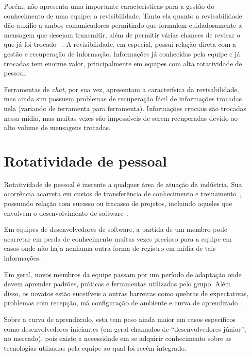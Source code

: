 Porém, não apresenta uma importante características para a gestão do conhecimento de uma equipe: a revisibilidade. Tanto ela quanto a revisabilidade dão auxílio a ambos comunicadores permitindo que formulem cuidadosamente a mensagem que desejam transmitir, além de permitir várias chances de revisar o que já foi trocado ~\cite{Olson2000}. A revisibilidade, em especial, possui relação direta com a gestão e recuperação de informação. Informações já conhecidas pela equipe e já trocadas tem enorme valor, principalmente em equipes com alta rotatividade de pessoal.

Ferramentas de \textit{chat}, por sua vez, apresentam a caracterísica da revisabilidade, mas ainda sim possuem problemas de recuperação fácil de informações trocadas nela (variando de ferramenta para ferramenta). Informações cruciais são trocadas nessa mídia, mas muitas vezes são impossíveis de serem recuperadas devido ao alto volume de mensagens trocadas.

\section{Rotatividade de pessoal}

Rotatividade de pessoal é inerente a qualquer área de atuação da indústria.
Sua ocorrência acarreta em custos de transferência de conhecimento e treinamento~\cite{Hall2008}, possuindo relação com sucesso ou fracasso de projetos, incluindo aqueles que envolvem o desenvolvimento de software~\cite{Hall2008}.

Em equipes de desenvolvedores de software, a partida de um membro pode acarretar em perda de conhecimento muitas vezes precioso para a equipe em casos onde não haja nenhuma outra forma de registro em mídia de tais informações.

Em geral, novos membros da equipe passam por um período de adaptação onde devem aprender padrões, práticas e ferramentas utilizadas pelo grupo. Além disso, os novatos estão sucetíveis a outras barreiras como quebras de expectativas, problemas com recepção, má configuração de ambiente e curva de aprendizado~\cite{Steinmacher2015}.

Sobre a curva de aprendizado, esta tem peso ainda maior em casos específicos como desenvolvedores iniciantes (em geral chamados de ``desenvolvedores júnior'', no mercado), pois existe a necessidade em se adquirir conhecimento sobre as tecnologias utlizadas pela equipe ao qual foi recém integrado.

